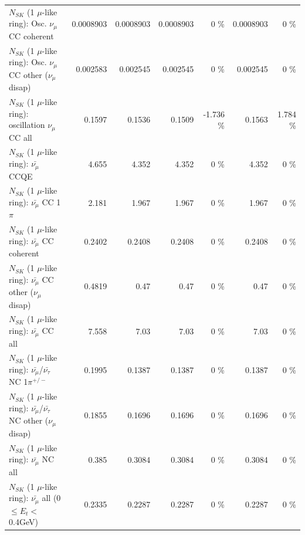 \begin{table}
\begin{tabular}{| l | r | r | r  r | r  r |}
                        $N_{SK}$ (1 $\mu$-like ring): Osc. $\nu_\mu$ CC coherent &       0.0008903 &       0.0008903 &       0.0008903 &        0 \%  &       0.0008903 &        0 \%  \\ 
         $N_{SK}$ (1 $\mu$-like ring): Osc. $\nu_\mu$ CC other ($\nu_\mu$ disap) &        0.002583 &        0.002545 &        0.002545 &        0 \%  &        0.002545 &        0 \%  \\ 
                      $N_{SK}$ (1 $\mu$-like ring): oscillation $\nu_\mu$ CC all &          0.1597 &          0.1536 &          0.1509 &   -1.736 \%  &          0.1563 &    1.784 \%  \\ 
\hline
\hline
                              $N_{SK}$ (1 $\mu$-like ring): $\bar{\nu_\mu}$ CCQE &           4.655 &           4.352 &           4.352 &        0 \%  &           4.352 &        0 \%  \\ 
                         $N_{SK}$ (1 $\mu$-like ring): $\bar{\nu_\mu}$ CC 1$\pi$ &           2.181 &           1.967 &           1.967 &        0 \%  &           1.967 &        0 \%  \\ 
                       $N_{SK}$ (1 $\mu$-like ring): $\bar{\nu_\mu}$ CC coherent &          0.2402 &          0.2408 &          0.2408 &        0 \%  &          0.2408 &        0 \%  \\ 
        $N_{SK}$ (1 $\mu$-like ring): $\bar{\nu_\mu}$ CC other ($\nu_\mu$ disap) &          0.4819 &            0.47 &            0.47 &        0 \%  &            0.47 &        0 \%  \\ 
                          $N_{SK}$ (1 $\mu$-like ring): $\bar{\nu_{\mu}}$ CC all &           7.558 &            7.03 &            7.03 &        0 \%  &            7.03 &        0 \%  \\ 
\hline
  $N_{SK}$ (1 $\mu$-like ring): $\bar{\nu_\mu}$/$\bar{\nu_\tau}$ NC 1$\pi^{+/-}$ &          0.1995 &          0.1387 &          0.1387 &        0 \%  &          0.1387 &        0 \%  \\ 
$N_{SK}$ (1 $\mu$-like ring): $\bar{\nu_\mu}$/$\bar{\nu_\tau}$ NC other ($\nu_\mu$ disap) &          0.1855 &          0.1696 &          0.1696 &        0 \%  &          0.1696 &        0 \%  \\ 
                          $N_{SK}$ (1 $\mu$-like ring): $\bar{\nu_{\mu}}$ NC all &           0.385 &          0.3084 &          0.3084 &        0 \%  &          0.3084 &        0 \%  \\ 
\hline
   $N_{SK}$ (1 $\mu$-like ring): $\bar{\nu_{\mu}}$ all (0 $\leq E_{t} <$ 0.4GeV) &          0.2335 &          0.2287 &          0.2287 &        0 \%  &          0.2287 &        0 \%  \\ 

\end{tabular}
\end{table}
